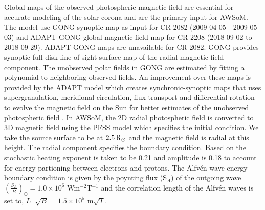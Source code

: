 \documentclass[namedreferences]{solarphysics}
\newcommand{\mrsun}{{\rm R_\odot}}
\begin{document}
\begin{article}
Global maps of the observed photospheric magnetic field are essential for accurate modeling of the solar corona and are the primary input for AWSoM. The model use GONG synoptic map as input for CR-2082 (2009-04-05 - 2009-05-03) and ADAPT-GONG global magnetic field map for CR-2208 (2018-09-02 to 2018-09-29). ADAPT-GONG maps are unavailable for CR-2082. GONG provides synoptic full disk line-of-sight surface map of the radial magnetic field component. The unobserved polar fields in GONG are estimated by fitting a polynomial to neighboring observed fields. An improvement over these maps is provided by the ADAPT model \citep{Wor2000} which creates synchronic-synoptic maps that uses supergranulation, meridional circulation, flux-transport and differential rotation to evolve the magnetic field on the Sun for better estimates of the unobserved photospheric field \citep{Arg2010, Hen2012}. 
In AWSoM, the 2D radial photospheric field is converted to 3D magnetic field using the PFSS model which specifies the initial condition. We take the source surface to be at $2.5 \, \mrsun$ and the magnetic field is radial at this height. The radial component specifies the boundary condition.
Based on \citet{Cha2011} the stochastic heating exponent is taken to be 0.21 and amplitude is 0.18 to account for energy partioning between electrons and protons. The Alfv\'{e}n wave energy boundary condition is given by the poynting flux (S$_{A}$) of the outgoing wave $(\frac{S_{A}}{B})_{\odot} = 1.0\times 10^{6}$ Wm$^{-2}$T$^{-1}$ and the correlation length of the Alfv\'{e}n waves is set to, $L_{\perp} \sqrt{B} = 1.5 \times 10^{5}$ m$\sqrt{T}$.


\end{article}
\end{document}
